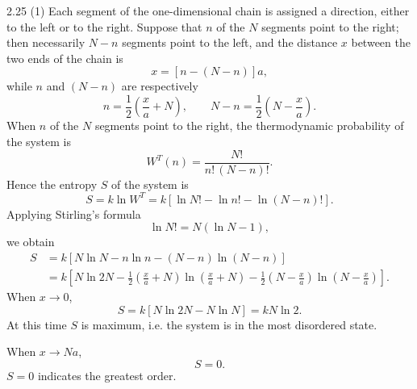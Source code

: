 \begin{solution}{2.25}
(1) Each segment of the one-dimensional chain is assigned a direction, either to the left or to
the right. Suppose that $n$ of the $N$ segments point to the right; then necessarily $N-n$
segments point to the left, and the distance $x$ between the two ends of the chain is
\begin{equation*}
x = \left[n-(N-n)\right]a,
\end{equation*}
while $n$ and $(N-n)$ are respectively
\begin{equation*}
n = \frac{1}{2}\left(\frac{x}{a}+N\right),\qquad
N-n = \frac{1}{2}\left(N-\frac{x}{a}\right).
\end{equation*}
When $n$ of the $N$ segments point to the right, the thermodynamic probability of the system is
\begin{equation*}
W^T(n) = \frac{N!}{n!\,(N-n)!}.
\end{equation*}
Hence the entropy $S$ of the system is
\begin{equation*}
S = k\ln W^T = k\left[\ln N!-\ln n!-\ln(N-n)!\right].
\end{equation*}
Applying Stirling's formula
\begin{equation*}
\ln N! = N\left(\ln N-1\right),
\end{equation*}
we obtain
\begin{align*}
S &= k\left[N\ln N-n\ln n-(N-n)\ln(N-n)\right]\\
&= k\left[N\ln 2N-\frac{1}{2}\left(\frac{x}{a}+N\right)\ln\left(\frac{x}{a}+N\right)
-\frac{1}{2}\left(N-\frac{x}{a}\right)\ln\left(N-\frac{x}{a}\right)\right].
\end{align*}
When $x\to 0$,
\begin{equation*}
S = k\left[N\ln 2N-N\ln N\right] = kN\ln 2 .
\end{equation*}
At this time $S$ is maximum, i.e. the system is in the most disordered state.

When $x\to Na$,
\begin{equation*}
S = 0 .
\end{equation*}
$S=0$ indicates the greatest order.


\end{solution}

